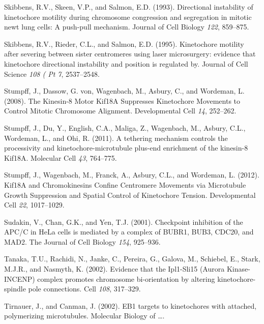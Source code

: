 \documentclass[12pt,a4paper,twoside,openright]{book}
\begin{document}
Skibbens, R.V., Skeen, V.P., and Salmon, E.D. (1993). Directional
instability of kinetochore motility during chromosome congression and
segregation in mitotic newt lung cells: A push-pull mechanism. Journal
of Cell Biology \emph{122}, 859--875.

Skibbens, R.V., Rieder, C.L., and Salmon, E.D. (1995). Kinetochore
motility after severing between sister centromeres using laser
microsurgery: evidence that kinetochore directional instability and
position is regulated by. Journal of Cell Science \emph{108 ( Pt 7},
2537--2548.

Stumpff, J., Dassow, G. von, Wagenbach, M., Asbury, C., and Wordeman, L.
(2008). The Kinesin-8 Motor Kif18A Suppresses Kinetochore Movements to
Control Mitotic Chromosome Alignment. Developmental Cell \emph{14},
252--262.

Stumpff, J., Du, Y., English, C.A., Maliga, Z., Wagenbach, M., Asbury,
C.L., Wordeman, L., and Ohi, R. (2011). A tethering mechanism controls
the processivity and kinetochore-microtubule plus-end enrichment of the
kinesin-8 Kif18A. Molecular Cell \emph{43}, 764--775.

Stumpff, J., Wagenbach, M., Franck, A., Asbury, C.L., and Wordeman, L.
(2012). Kif18A and Chromokinesins Confine Centromere Movements via
Microtubule Growth Suppression and Spatial Control of Kinetochore
Tension. Developmental Cell \emph{22}, 1017--1029.

Sudakin, V., Chan, G.K., and Yen, T.J. (2001). Checkpoint inhibition of
the APC/C in HeLa cells is mediated by a complex of BUBR1, BUB3, CDC20,
and MAD2. The Journal of Cell Biology \emph{154}, 925--936.

Tanaka, T.U., Rachidi, N., Janke, C., Pereira, G., Galova, M., Schiebel,
E., Stark, M.J.R., and Nasmyth, K. (2002). Evidence that the Ipl1-Sli15
(Aurora Kinase-INCENP) complex promotes chromosome bi-orientation by
altering kinetochore-spindle pole connections. Cell \emph{108},
317--329.

Tirnauer, J., and Canman, J. (2002). EB1 targets to kinetochores with
attached, polymerizing microtubules. Molecular Biology of \ldots{}.
\end{document}
